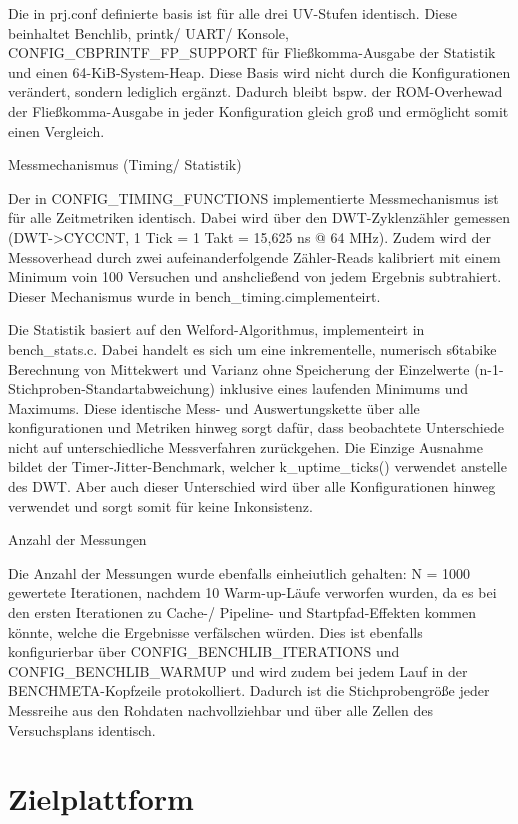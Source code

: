 Die in prj.conf definierte basis ist für alle drei UV-Stufen identisch. Diese beinhaltet Benchlib, printk/ UART/ Konsole, CONFIG\_CBPRINTF\_FP\_SUPPORT für Fließkomma-Ausgabe der Statistik und einen 64-KiB-System-Heap. Diese Basis wird nicht durch die Konfigurationen verändert, sondern lediglich ergänzt. Dadurch bleibt bspw. der ROM-Overhewad der Fließkomma-Ausgabe in jeder Konfiguration gleich groß und ermöglicht somit einen Vergleich.

Messmechanismus (Timing/ Statistik)

Der in CONFIG\_TIMING\_FUNCTIONS implementierte Messmechanismus ist für alle Zeitmetriken identisch. Dabei wird über den DWT-Zyklenzähler gemessen (DWT->CYCCNT, 1 Tick = 1 Takt = 15,625 ns @ 64 MHz). Zudem wird der Messoverhead durch zwei aufeinanderfolgende Zähler-Reads kalibriert mit einem Minimum voin 100 Versuchen und anshcließend von jedem Ergebnis subtrahiert. Dieser Mechanismus wurde in bench\_timing.cimplementeirt.

Die Statistik basiert auf den Welford-Algorithmus, implementeirt in bench\_stats.c. Dabei handelt es sich um eine inkrementelle, numerisch s6tabike Berechnung von Mittekwert und Varianz ohne Speicherung der Einzelwerte (n-1-Stichproben-Standartabweichung) inklusive eines laufenden Minimums und Maximums. Diese identische Mess- und Auswertungskette über alle konfigurationen und Metriken hinweg sorgt dafür, dass beobachtete Unterschiede nicht auf unterschiedliche Messverfahren zurückgehen. Die Einzige Ausnahme bildet der Timer-Jitter-Benchmark, welcher k\_uptime\_ticks() verwendet anstelle des DWT. Aber auch dieser Unterschied wird über alle Konfigurationen hinweg verwendet und sorgt somit für keine Inkonsistenz.

Anzahl der Messungen

Die Anzahl der Messungen wurde ebenfalls einheiutlich gehalten: N = 1000 gewertete Iterationen, nachdem 10 Warm-up-Läufe verworfen wurden, da es bei den ersten Iterationen zu Cache-/ Pipeline- und Startpfad-Effekten kommen könnte, welche die Ergebnisse verfälschen würden. Dies ist ebenfalls konfigurierbar über CONFIG\_BENCHLIB\_ITERATIONS und CONFIG\_BENCHLIB\_WARMUP und wird zudem bei jedem Lauf in der BENCHMETA-Kopfzeile protokolliert. Dadurch ist die Stichprobengröße jeder Messreihe aus den Rohdaten nachvollziehbar und über alle Zellen des Versuchsplans identisch.

\section{Zielplattform}

